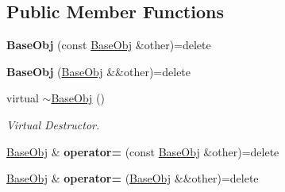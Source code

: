 \subsection*{Public Member Functions}
\begin{DoxyCompactItemize}
\item 
\hypertarget{class_helios_1_1_base_obj_aa278e49125c0c84d26906ae47cfff727}{}{\bfseries Base\+Obj} (const \hyperlink{class_helios_1_1_base_obj}{Base\+Obj} \&other)=delete\label{class_helios_1_1_base_obj_aa278e49125c0c84d26906ae47cfff727}

\item 
\hypertarget{class_helios_1_1_base_obj_ad2127aa4f505b6183a9d91d384062b98}{}{\bfseries Base\+Obj} (\hyperlink{class_helios_1_1_base_obj}{Base\+Obj} \&\&other)=delete\label{class_helios_1_1_base_obj_ad2127aa4f505b6183a9d91d384062b98}

\item 
\hypertarget{class_helios_1_1_base_obj_a286cd12e5193430bb3ef554aac0152d9}{}virtual \hyperlink{class_helios_1_1_base_obj_a286cd12e5193430bb3ef554aac0152d9}{$\sim$\+Base\+Obj} ()\label{class_helios_1_1_base_obj_a286cd12e5193430bb3ef554aac0152d9}

\begin{DoxyCompactList}\small\item\em Virtual Destructor. \end{DoxyCompactList}\item 
\hypertarget{class_helios_1_1_base_obj_a499a49d6f7f7f79190e6d598eab4391e}{}\hyperlink{class_helios_1_1_base_obj}{Base\+Obj} \& {\bfseries operator=} (const \hyperlink{class_helios_1_1_base_obj}{Base\+Obj} \&other)=delete\label{class_helios_1_1_base_obj_a499a49d6f7f7f79190e6d598eab4391e}

\item 
\hypertarget{class_helios_1_1_base_obj_ab588e3ffe972a53de418f50558651f2f}{}\hyperlink{class_helios_1_1_base_obj}{Base\+Obj} \& {\bfseries operator=} (\hyperlink{class_helios_1_1_base_obj}{Base\+Obj} \&\&other)=delete\label{class_helios_1_1_base_obj_ab588e3ffe972a53de418f50558651f2f}


\end{DoxyCompactItemize}
